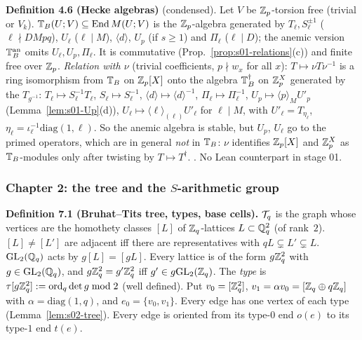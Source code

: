 \medskip
\noindent{}\label{rpt:def:s01-T}\textbf{Definition 4.6 (Hecke algebras)} (condensed).
Let $V$ be $\mathbb{Z}_p$-torsion free (trivial or $V_k$). $\mathbb{T}_B(U;V)\subseteq\operatorname{End}M(U;V)$ is the $\mathbb{Z}_p$-algebra generated by
$T_\ell,S_\ell^{\pm1}$ ($\ell\nmid DMpq$), $U_\ell$ ($\ell\mid M$), $\langle d\rangle$, $U_p$ (if $s\ge1$) and $\Pi_\ell$ ($\ell\mid D$); the anemic
version $\mathbb{T}_B^{\mathrm{an}}$ omits $U_\ell,U_p,\Pi_\ell$. It is commutative (Prop.~\ref{prop:s01-relations}(c)) and finite free over $\mathbb{Z}_p$.
\emph{Relation with $\nu$} (trivial coefficients, $p\nmid w_x$ for all $x$): $T\mapsto\nu T\nu^{-1}$ is a ring isomorphism from $\mathbb{T}_B$ on
$\mathbb{Z}_p[X]$ onto the algebra $\mathbb{T}_B^\dagger$ on $\mathbb{Z}_p^X$ generated by the $T_{g^{-1}}$: $T_\ell\mapsto S_\ell^{-1}T_\ell$, $S_\ell\mapsto S_\ell^{-1}$,
$\langle d\rangle\mapsto\langle d\rangle^{-1}$, $\Pi_\ell\mapsto\Pi_\ell^{-1}$, $U_p\mapsto\langle p\rangle_MU'_p$ (Lemma~\ref{lem:s01-Up}(d)),
$U_\ell\mapsto\langle\ell\rangle_{(\ell)}U'_\ell$ for $\ell\mid M$, with $U'_\ell=T_{\eta_\ell}$, $\eta_\ell=\iota_\ell^{-1}\mathrm{diag}(1,\ell)$. So the
anemic algebra is stable, but $U_p$, $U_\ell$ go to the primed operators, which are in general \emph{not} in $\mathbb{T}_B$: $\nu$ identifies $\mathbb{Z}_p[X]$
and $\mathbb{Z}_p^X$ as $\mathbb{T}_B$-modules only after twisting by $T\mapsto T^\dagger$. \stproved{}. No Lean counterpart in stage 01.

\subsubsection*{Chapter 2: the tree and the $S$-arithmetic group}

\noindent{}\label{rpt:def:s02-tree}\textbf{Definition 7.1 (Bruhat--Tits tree, types, base cells).}
$\mathcal{T}_q$ is the graph whose vertices are the homothety classes $[L]$ of $\mathbb{Z}_q$-lattices $L\subset\mathbb{Q}_q^2$ (of rank~$2$).
$[L]\ne[L']$ are adjacent iff there are representatives with $qL\subsetneq L'\subsetneq L$.
$\mathrm{GL}_2(\mathbb{Q}_q)$ acts by $g[L]=[gL]$. Every lattice is of the form $g\mathbb{Z}_q^2$ with $g\in\mathrm{GL}_2(\mathbb{Q}_q)$, and $g\mathbb{Z}_q^2=g'\mathbb{Z}_q^2$ iff
$g'\in g\mathrm{GL}_2(\mathbb{Z}_q)$. The \emph{type} is $\tau[g\mathbb{Z}_q^2]:=\mathrm{ord}_q\det g\bmod 2$ (well defined).
Put $v_0=[\mathbb{Z}_q^2]$, $v_1=\alpha v_0=[\mathbb{Z}_q\oplus q\mathbb{Z}_q]$ with $\alpha=\mathrm{diag}(1,q)$, and $e_0=\{v_0,v_1\}$. Every edge has one vertex of
each type (Lemma~\ref{lem:s02-tree}). Every edge is oriented from its type-$0$ end $o(e)$ to its type-$1$ end $t(e)$.

